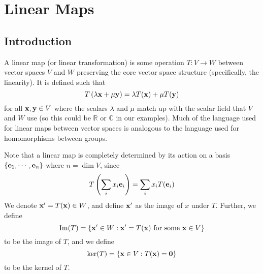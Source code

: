 \documentclass{article}
\begin{document}
\section{Linear Maps}
\subsection{Introduction}
A linear map (or linear transformation) is some operation $T: V \to W$ between vector spaces $V$ and $W$ preserving the core vector space structure (specifically, the linearity). It is defined such that
\[ T\left(\lambda \vb x + \mu \vb y\right) = \lambda T(\vb x) + \mu T(\vb y) \]
for all $\vb x, \vb y \in V$ where the scalars $\lambda$ and $\mu$ match up with the scalar field that $V$ and $W$ use (so this could be $\mathbb R$ or $\mathbb C$ in our examples). Much of the language used for linear maps between vector spaces is analogous to the language used for homomorphisms between groups.

Note that a linear map is completely determined by its action on a basis $\{ \vb e_1, \cdots, \vb e_n \}$ where $n = \dim V$, since
\[ T\left(\sum_i x_i \vb e_i \right) = \sum_i x_i T(\vb e_i) \]
We denote $\vb x' = T(\vb x) \in W$, and define $\vb x'$ as the image of $x$ under $T$. Further, we define
\[ \Im (T) = \{ \vb x' \in W : \vb x' =T(\vb x) \text{ for some } \vb x \in V \} \]
to be the image of $T$, and we define
\[ \ker (T) = \{ \vb x \in V : T(\vb x) = \vb 0 \} \]
to be the kernel of $T$.
\end{document}

